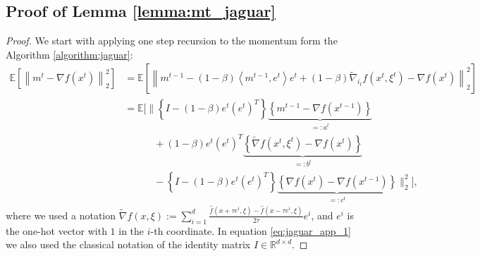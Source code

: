 \documentclass{article}
\theoremstyle{plain}
\theoremstyle{definition}
\theoremstyle{remark}
\newcommand{\expect}[1]{\mathbb{E}\left[ #1 \right]}
\newcommand{\norm}[1]{\left\| #1 \right\|}
\newcommand{\expectBig}[1]{\mathbb{E}\Big[ #1 \Big]}
\newcommand{\normBig}[1]{\Big\| #1 \Big\|}
\newcommand{\dotprod}[2]{\left\langle #1,#2 \right\rangle}
\begin{document}
    \subsection{Proof of Lemma \ref{lemma:mt_jaguar}}
    \begin{proof}
        We start with applying one step recursion to the momentum form the Algorithm \ref{algorithm:jaguar}:
        \begin{align}
        \label{eq:jaguar_app_1}
            \expect{\norm{m^{t} - \nabla f(x^t)}_2^2} 
            &=
            \expect{\norm{
                m^{t-1} 
                - (1-\beta) \dotprod{m^{t-1}}{e^t}e^t 
                + (1-\beta) \widetilde{\nabla}_{i_t} f(x^{t}, \xi^t)
                - \nabla f(x^t)
            }_2^2}
            \nonumber
            \\&=
            \expectBig{\normBig{
                \left\{I - (1-\beta)e^t (e^t)^T \right\} \underbrace{\left\{ m^{t-1} - \nabla f(x^{t-1}) \right\}}_{=: a^{t}}
                \nonumber
                \\&\qquad\quad+ 
                (1 - \beta) e^t (e^t)^T \underbrace{\left\{ \widetilde{\nabla} f(x^t, \xi^t) - \nabla f(x^t) \right\}}_{=: b^{t}}
                \nonumber
                \\&\qquad\quad- 
                \left\{I - (1-\beta)e^t (e^t)^T \right\} \underbrace{\left\{ \nabla f(x^t) - \nabla f(x^{t-1}) \right\}}_{=:c^t}
            }_2^2},
        \end{align}
        where we used a notation $\widetilde{\nabla} f(x, \xi) := \sum_{i=1}^d \frac{\hat{f}(x + \tau e^i, \xi) - \hat{f}(x - \tau e^i, \xi)}{2 \tau} e^i$, and $e^i$ is the one-hot vector with $1$ in the $i$-th coordinate. In equation \eqref{eq:jaguar_app_1} we also used the classical notation of the identity matrix $I \in \mathbb{R}^{d \times d}$.


\end{proof}
\end{document}
